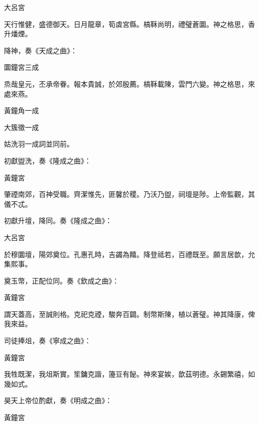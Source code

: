 \begin{pinyinscope}
 大呂宮



 天行惟健，盛德御天。日月龍章，筍虡宮縣。槁鞂尚明，禮璧蒼圜。神之格思，香升燔煙。



 降神，奏《天成之曲》：



 圜鐘宮三成



 烝哉皇元，丕承帝眷。報本貴誠，於郊殷薦。槁鞂載陳，雲門六變。神之格思，來處來燕。



 黃鐘角一成



 大簇徵一成



 姑洗羽一成詞並同前。



 初獻盥洗，奏《隆成之曲》：



 黃鐘宮



 肇禋南郊，百神受職。齊潔惟先，匪馨於稷。乃沃乃盥，祠壇是陟。上帝監觀，其儀不忒。



 初獻升壇，降同。奏《隆成之曲》：



 大呂宮



 於穆圜壇，陽郊奠位。孔惠孔時，吉蠲為饎。降登祗若，百禮既至。願言居歆，允集熙事。



 奠玉幣，正配位同。奏《欽成之曲》：



 黃鐘宮



 謂天蓋高，至誠則格。克祀克禋，駿奔百闢。制幣斯陳，植以蒼璧。神其降康，俾我來益。



 司徒捧俎，奏《寧成之曲》：



 黃鐘宮



 我牲既潔，我俎斯實。笙鏞克諧，籩豆有飶。神來宴娭，歆茲明德。永錫繁禧，如幾如式。



 昊天上帝位酌獻，奏《明成之曲》：



 黃鐘宮




\end{pinyinscope}
